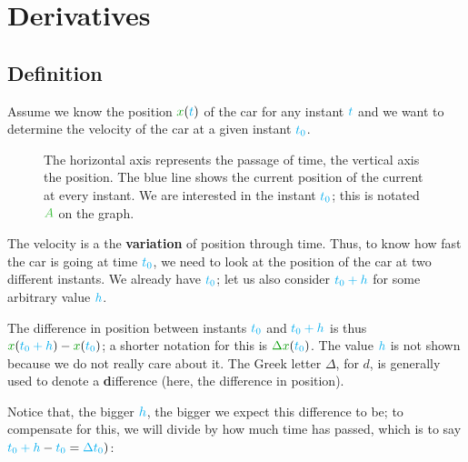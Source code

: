 \section{Derivatives}


\subsection{Definition}

Assume we know the position $\dist{x}(\delay{t})$ of the car for any
instant $\textcolor{cyan}{t}$ and we want to determine the velocity of the car at
a given instant $\textcolor{cyan}{t_0}$.

\begin{figure}[H]
\centering
{}
\caption{
	The horizontal axis represents the passage of time, the vertical
	axis the position. The blue line shows the current position of
	the current at every instant. We are interested in the instant
	$\textcolor{cyan}{t_0}$; this is notated $\posit{A}$ on the graph.
}
\end{figure}

The velocity is a the \textbf{variation} of position through time. Thus,
to know how fast the car is going at time $\textcolor{cyan}{t_0}$, we need to look
at the position of the car at two different instants. We already have
$\textcolor{cyan}{t_0}$; let us also consider $\textcolor{cyan}{t_0+h}$ for some arbitrary
value $\textcolor{cyan}{h}$.

The difference in position between instants $\textcolor{cyan}{t_0}$ and
$\textcolor{cyan}{t_0+h}$ is thus $\dist{x}(\delay{t_0+h}) - \dist{x}(\delay{t_0})$;
a shorter notation for this is $\dist{\Delta x}(\delay{t_0})$. The
value $\textcolor{cyan}{h}$ is not shown because we do not really care about
it. The Greek letter $\Delta$, for $d$, is generally used to denote a
\textbf{d}ifference (here, the difference in position).

Notice that, the bigger $\textcolor{cyan}{h}$, the bigger we expect this difference
to be; to compensate for this, we will divide by how much time has passed,
which is to say $\textcolor{cyan}{t_0+h} - \textcolor{cyan}{t_0} = \textcolor{cyan}{\Delta t_0})$:

